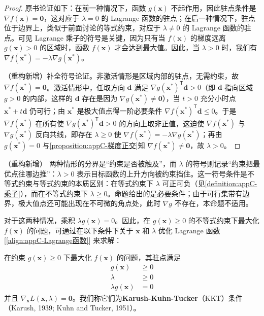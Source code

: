 \documentclass[../main.tex]{subfiles}
\begin{document}
\begin{proof}
原书论证如下：在前一种情况下，函数 $g(\bm{x})$ 不起作用，因此驻点条件是 $\nabla f(\bm{x})=\bm{0}$，这对应于 $\lambda=0$ 的 Lagrange 函数的驻点；在后一种情况下，驻点位于边界上，类似于前面讨论的等式约束，对应于 $\lambda\neq0$ 的 Lagrange 函数的驻点。可见 Lagrange 乘子的符号是关键，因为只有当 $f(\bm{x})$ 的梯度远离 $g(\bm{x})>0$ 的区域时，函数 $f(\bm{x})$ 才会达到最大值。因此，当 $\lambda>0$ 时，我们有 $\nabla f(\bm{x}^{*})=-\lambda\nabla g(\bm{x}^{*})$。

（重构新增）补全符号论证。非激活情形是区域内部的驻点，无需约束，故 $\nabla f(\bm{x}^{*})=\bm{0}$。激活情形中，任取方向 $\bm{d}$ 满足 $\nabla g(\bm{x}^{*})^{\mathsf{T}}\bm{d}>0$（即 $\bm{d}$ 指向区域 $g>0$ 的内部，这样的 $\bm{d}$ 存在是因为 $\nabla g(\bm{x}^{*})\neq\bm{0}$），当 $t>0$ 充分小时点 $\bm{x}^{*}+t\bm{d}$ 仍可行；由 $\bm{x}^{*}$ 是极大值点得一阶必要条件 $\nabla f(\bm{x}^{*})^{\mathsf{T}}\bm{d}\leqslant0$。于是 $\nabla f(\bm{x}^{*})$ 在所有使 $\nabla g(\bm{x}^{*})^{\mathsf{T}}\bm{d}>0$ 的方向上取非正值，这迫使 $\nabla f(\bm{x}^{*})$ 与 $\nabla g(\bm{x}^{*})$ 反向共线，即存在 $\lambda\geqslant0$ 使 $\nabla f(\bm{x}^{*})=-\lambda\nabla g(\bm{x}^{*})$；再由 $g(\bm{x}^{*})=0$ 与\cref{proposition:appC-梯度正交}知 $\nabla f(\bm{x}^{*})\neq\bm{0}$，故 $\lambda>0$。
\end{proof}

\begin{remark}（重构新增）
两种情形的分界是“约束是否被触及”，而 $\lambda$ 的符号则记录“约束把最优点往哪边推”：$\lambda>0$ 表示目标函数的上升方向被约束挡住。这一符号条件是不等式约束与等式约束的本质区别：在等式约束下 $\lambda$ 可正可负（见\cref{definition:appC-乘子}），而在不等式约束下 $\lambda\geqslant0$。命题给出的是必要条件；由于可行集带有边界，极大值点还可能出现在不可微的角点处，此时 $\nabla g$ 不存在，本命题不适用。
\end{remark}

对于这两种情况，乘积 $\lambda g(\bm{x})=0$。因此，在 $g(\bm{x})\geqslant0$ 的不等式约束下最大化 $f(\bm{x})$ 的问题，可通过在以下条件下关于 $\bm{x}$ 和 $\lambda$ 优化 Lagrange 函数 [\eqref{align:appC-Lagrange函数}] 来求解：
\begin{theorem}\label{theorem:appC-KKT}
在约束 $g(\bm{x})\geqslant0$ 下最大化 $f(\bm{x})$ 的问题，其驻点满足
\begin{align}
  g(\bm{x})&\geqslant0
  \label{align:appC-KKT1}\\
  \lambda&\geqslant0
  \label{align:appC-KKT2}\\
  \lambda g(\bm{x})&=0
  \label{align:appC-KKT3}
\end{align}
并且 $\nabla_{\bm{x}}L(\bm{x},\lambda)=\bm{0}$。我们称它们为\textbf{Karush-Kuhn-Tucker}（KKT）条件（Karush, 1939; Kuhn and Tucker, 1951）。
\end{theorem}
\end{document}
